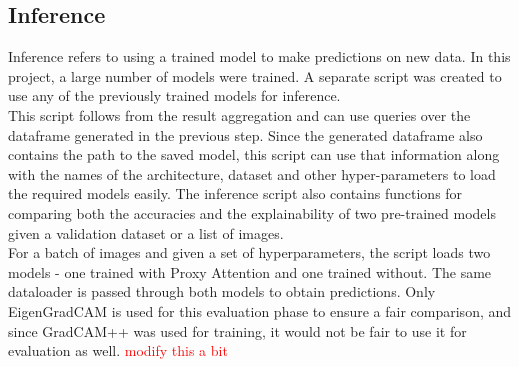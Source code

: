 \subsection{Inference}
Inference refers to using a trained model to make predictions on new data. In this project, a large number of models were trained. A separate script was created to use any of the previously trained models for inference.\\
This script follows from the result aggregation and can use queries over the dataframe generated in the previous step. Since the generated dataframe also contains the path to the saved model, this script can use that information along with the names of the architecture, dataset and other hyper-parameters to load the required models easily.
The inference script also contains functions for comparing both the accuracies and the explainability of two pre-trained models given a validation dataset or a list of images.\\
For a batch of images and given a set of hyperparameters, the script loads two models - one trained with Proxy Attention and one trained without. The same dataloader is passed through both models to obtain predictions. Only EigenGradCAM is used for this evaluation phase to ensure a fair comparison, and since GradCAM++ was used for training, it would not be fair to use it for evaluation as well. \textcolor{red}{modify this a bit}